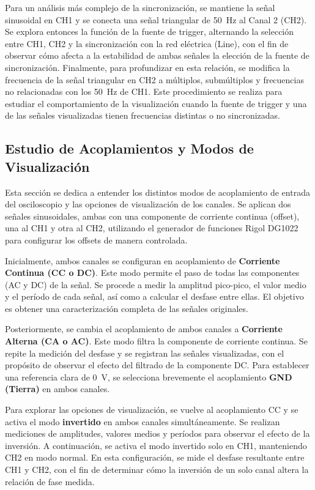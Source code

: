 Para un análisis más complejo de la sincronización, se mantiene la señal sinusoidal en CH1 y se conecta una señal triangular de \SI{50}{\hertz} al Canal 2 (CH2). Se explora entonces la función de la fuente de trigger, alternando la selección entre CH1, CH2 y la sincronización con la red eléctrica (Line), con el fin de observar cómo afecta a la estabilidad de ambas señales la elección de la fuente de sincronización. Finalmente, para profundizar en esta relación, se modifica la frecuencia de la señal triangular en CH2 a múltiplos, submúltiplos y frecuencias no relacionadas con los \SI{50}{\hertz} de CH1. Este procedimiento se realiza para estudiar el comportamiento de la visualización cuando la fuente de trigger y una de las señales visualizadas tienen frecuencias distintas o no sincronizadas.

\subsection{Estudio de Acoplamientos y Modos de Visualización}
Esta sección se dedica a entender los distintos modos de acoplamiento de entrada del osciloscopio y las opciones de visualización de los canales. Se aplican dos señales sinusoidales, ambas con una componente de corriente continua (offset), una al CH1 y otra al CH2, utilizando el generador de funciones Rigol DG1022 para configurar los offsets de manera controlada.

Inicialmente, ambos canales se configuran en acoplamiento de \textbf{Corriente Continua (CC o DC)}. Este modo permite el paso de todas las componentes (AC y DC) de la señal. Se procede a medir la amplitud pico-pico, el valor medio y el período de cada señal, así como a calcular el desfase entre ellas. El objetivo es obtener una caracterización completa de las señales originales.

Posteriormente, se cambia el acoplamiento de ambos canales a \textbf{Corriente Alterna (CA o AC)}. Este modo filtra la componente de corriente continua. Se repite la medición del desfase y se registran las señales visualizadas, con el propósito de observar el efecto del filtrado de la componente DC. Para establecer una referencia clara de \SI{0}{\volt}, se selecciona brevemente el acoplamiento \textbf{GND (Tierra)} en ambos canales.

Para explorar las opciones de visualización, se vuelve al acoplamiento CC y se activa el modo \textbf{invertido} en ambos canales simultáneamente. Se realizan mediciones de amplitudes, valores medios y períodos para observar el efecto de la inversión. A continuación, se activa el modo invertido solo en CH1, manteniendo CH2 en modo normal. En esta configuración, se mide el desfase resultante entre CH1 y CH2, con el fin de determinar cómo la inversión de un solo canal altera la relación de fase medida.

